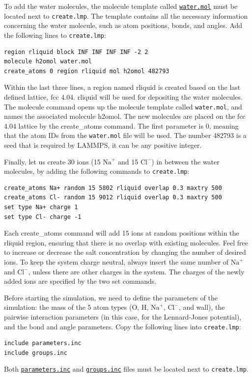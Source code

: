 \documentclass[9pt,tutorial]{livecoms}
\newcommand{\lmpcmd}[1]{\hspace{0pt}\colorbox{listing}{\textcolor{command}{\small{#1}}}\hspace{0pt}} %
\newcommand{\flecmd}[1]{\textcolor{command}{\texttt{#1}}} %
\newcommand{\dwlcmd}[1]{\textcolor{download}{\texttt{#1}}} %
\newcommand{\filepath}{https://raw.githubusercontent.com/lammpstutorials/lammpstutorials-article/main/files/}
\begin{document}
To add the water molecules, the molecule
template called \href{\filepath tutorial4/water.mol}{\dwlcmd{water.mol}}
must be located next to \flecmd{create.lmp}.  The template contains all the
necessary information concerning the water molecule, such as atom positions,
bonds, and angles.  Add the following lines to \flecmd{create.lmp}:
\begin{lstlisting}
region rliquid block INF INF INF INF -2 2
molecule h2omol water.mol
create_atoms 0 region rliquid mol h2omol 482793
\end{lstlisting}
Within the last three lines, a \lmpcmd{region} named \lmpcmd{rliquid} is
created based on the last defined lattice, \lmpcmd{fcc 4.04}.  \lmpcmd{rliquid}
will be used for depositing the water molecules.  The \lmpcmd{molecule} command
opens up the molecule template called \flecmd{water.mol}, and names the
associated molecule \lmpcmd{h2omol}.  The new molecules are placed on the
\lmpcmd{fcc 4.04} lattice by the \lmpcmd{create\_atoms} command.  The first
parameter is 0, meaning that the atom IDs from the \flecmd{water.mol} file
will be used.  The number \lmpcmd{482793} is a seed that is required by LAMMPS,
it can be any positive integer.

Finally, let us create 30 ions (15 $\text{Na}^+$ and 15 $\text{Cl}^-$) in between
the water molecules, by adding the following commands to \flecmd{create.lmp}:
\begin{lstlisting}
create_atoms Na+ random 15 5802 rliquid overlap 0.3 maxtry 500
create_atoms Cl- random 15 9012 rliquid overlap 0.3 maxtry 500
set type Na+ charge 1
set type Cl- charge -1
\end{lstlisting}
Each \lmpcmd{create\_atoms} command will add 15 ions at random positions
within the \lmpcmd{rliquid} region, ensuring that there is no \lmpcmd{overlap}
with existing molecules.  Feel free to increase or decrease the salt concentration
by changing the number of desired ions.  To keep the system charge neutral,
always insert the same number of $\text{Na}^+$ and $\text{Cl}^-$, unless there
are other charges in the system.  The charges of the newly added ions are specified
by the two \lmpcmd{set} commands.

Before starting the simulation, we need to define the parameters of the
simulation: the mass of the 5 atom types (O, H, $\text{Na}^+$, $\text{Cl}^-$,
and wall), the pairwise interaction parameters (in this case, for the
Lennard-Jones potential), and the bond and angle parameters.  Copy the following
lines into \flecmd{create.lmp}:
\begin{lstlisting}
include parameters.inc
include groups.inc
\end{lstlisting}
Both \href{\filepath tutorial4/parameters.inc}{\dwlcmd{parameters.inc}}
and \href{\filepath tutorial4/groups.inc}{\dwlcmd{groups.inc}} files
must be located next to \flecmd{create.lmp}.
\end{document}

